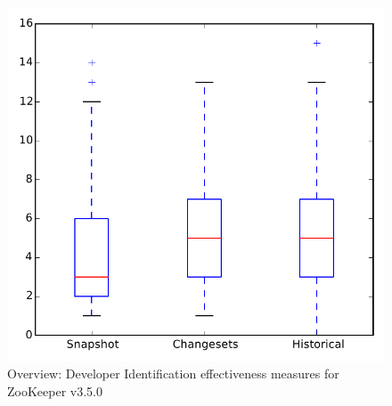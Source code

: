 
\begin{figure}
\centering
\includegraphics[height=0.4\textheight]{figures/dit/all_zookeeper}
\caption{Overview: Developer Identification effectiveness measures for ZooKeeper v3.5.0}
\label{fig:dit:all:zookeeper}
\end{figure}
